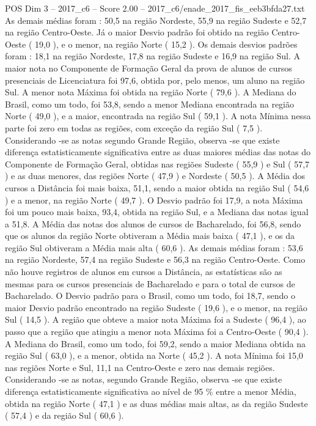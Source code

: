 \begin{textsample}{POS Dim 3 – 2017\_c6 – Score 2.00 – 2017\_c6/enade\_2017\_fis\_eeb3bfda27.txt}
As demais médias foram : 50,5 na região Nordeste, 55,9 na região Sudeste e 52,7 na região Centro-Oeste.
Já o maior Desvio padrão foi obtido na região Centro-Oeste ( 19,0 ), e o menor, na região Norte ( 15,2 ).
Os demais desvios padrões foram : 18,1 na região Nordeste, 17,8 na região Sudeste e 16,9 na região Sul.
A maior nota no Componente de Formação Geral da prova de alunos de cursos presenciais de Licenciatura foi 97,6, obtida por, pelo menos, um aluno na região Sul.
A menor nota Máxima foi obtida na região Norte ( 79,6 ).
A Mediana do Brasil, como um todo, foi 53,8, sendo a menor Mediana encontrada na região Norte ( 49,0 ), e a maior, encontrada na região Sul ( 59,1 ).
A nota Mínima nessa parte foi zero em todas as regiões, com exceção da região Sul ( 7,5 ).
Considerando -se as notas segundo Grande Região, observa -se que existe diferença estatisticamente significativa entre as duas maiores médias das notas do Componente de Formação Geral, obtidas nas regiões Sudeste ( 55,9 ) e Sul ( 57,7 ) e as duas menores, das regiões Norte ( 47,9 ) e Nordeste ( 50,5 ).
A Média dos cursos a Distância foi mais baixa, 51,1, sendo a maior obtida na região Sul ( 54,6 ) e a menor, na região Norte ( 49,7 ).
O Desvio padrão foi 17,9, a nota Máxima foi um pouco mais baixa, 93,4, obtida na região Sul, e a Mediana das notas igual a 51,8.
A Média das notas dos alunos de cursos de Bacharelado, foi 56,8, sendo que os alunos da região Norte obtiveram a Média mais baixa ( 47,1 ), e os da região Sul obtiveram a Média mais alta ( 60,6 ).
As demais médias foram : 53,6 na região Nordeste, 57,4 na região Sudeste e 56,3 na região Centro-Oeste.
Como não houve registros de alunos em cursos a Distância, as estatísticas são as mesmas para os cursos presenciais de Bacharelado e para o total de cursos de Bacharelado.
O Desvio padrão para o Brasil, como um todo, foi 18,7, sendo o maior Desvio padrão encontrado na região Sudeste ( 19,6 ), e o menor, na região Sul ( 14,5 ).
A região que obteve a maior nota Máxima foi a Sudeste ( 96,4 ), ao passo que a região que atingiu a menor nota Máxima foi a Centro-Oeste ( 90,4 ).
A Mediana do Brasil, como um todo, foi 59,2, sendo a maior Mediana obtida na região Sul ( 63,0 ), e a menor, obtida na Norte ( 45,2 ).
A nota Mínima foi 15,0 nas regiões Norte e Sul, 11,1 na Centro-Oeste e zero nas demais regiões.
Considerando -se as notas, segundo Grande Região, observa -se que existe diferença estatisticamente significativa ao nível de 95 \% entre a menor Média, obtida na região Norte ( 47,1 ) e as duas médias mais altas, as da região Sudeste ( 57,4 ) e da região Sul ( 60,6 ).

\end{textsample}
